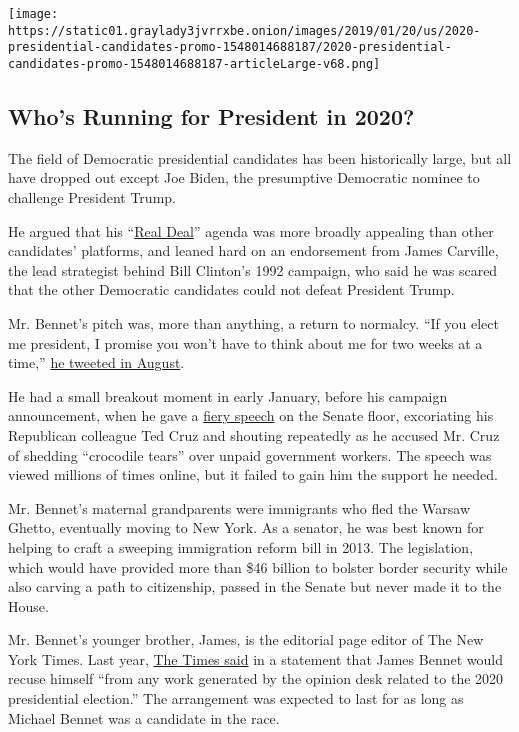 \href{https://www.nytimes3xbfgragh.onion/interactive/2019/us/politics/2020-presidential-candidates.html}{}

\texttt{[image: https://static01.graylady3jvrrxbe.onion/images/2019/01/20/us/2020-presidential-candidates-promo-1548014688187/2020-presidential-candidates-promo-1548014688187-articleLarge-v68.png]}

\hypertarget{whos-running-for-president-in-2020}{%
\subsection{Who's Running for President in
2020?}\label{whos-running-for-president-in-2020}}

The field of Democratic presidential candidates has been historically
large, but all have dropped out except Joe Biden, the presumptive
Democratic nominee to challenge President Trump.

He argued that his ``\href{https://michaelbennet.com/RealDeal/}{Real
Deal}'' agenda was more broadly appealing than other candidates'
platforms, and leaned hard on an endorsement from James Carville, the
lead strategist behind Bill Clinton's 1992 campaign, who said he was
scared that the other Democratic candidates could not defeat President
Trump.

Mr. Bennet's pitch was, more than anything, a return to normalcy. ``If
you elect me president, I promise you won't have to think about me for
two weeks at a time,''
\href{https://twitter.com/MichaelBennet/status/1158806845953323008?s=20}{he
tweeted in August}.

He had a small breakout moment in early January, before his campaign
announcement, when he gave a
\href{https://www.youtube.com/watch?v=78dsjOIE5L8\&feature=youtu.be}{fiery
speech} on the Senate floor, excoriating his Republican colleague Ted
Cruz and shouting repeatedly as he accused Mr. Cruz of shedding
``crocodile tears'' over unpaid government workers. The speech was
viewed millions of times online, but it failed to gain him the support
he needed.

Mr. Bennet's maternal grandparents were immigrants who fled the Warsaw
Ghetto, eventually moving to New York. As a senator, he was best known
for helping to craft a sweeping immigration reform bill in 2013. The
legislation, which would have provided more than \$46 billion to bolster
border security while also carving a path to citizenship, passed in the
Senate but never made it to the House.

Mr. Bennet's younger brother, James, is the editorial page editor of The
New York Times. Last year,
\href{https://www.nytimes3xbfgragh.onion/2019/05/02/business/media/james-michael-bennet-new-york-times.html}{The
Times said} in a statement that James Bennet would recuse himself ``from
any work generated by the opinion desk related to the 2020 presidential
election.'' The arrangement was expected to last for as long as Michael
Bennet was a candidate in the race.

